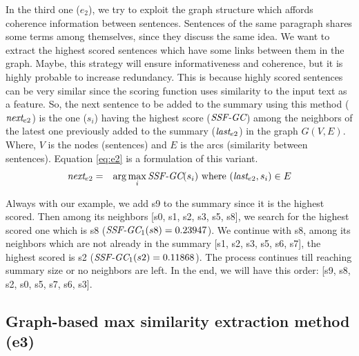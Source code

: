 In the third one ($ e_2 $), we try to exploit the graph structure which affords coherence information between sentences.
Sentences of the same paragraph shares some terms among themselves, since they discuss the same idea.
We want to extract the highest scored sentences which have some links between them in the graph.
Maybe, this strategy will ensure informativeness and coherence, but it is highly probable to increase redundancy. 
This is because highly scored sentences can be very similar since the scoring function uses similarity to the input text as a feature.  
So, the next sentence to be added to the summary using this method ($\operatorname{\textit{next}}_{e2}$) is the one ($s_i$) having the highest score ($ \operatorname{\textit{SSF-GC}} $) among the neighbors of the latest one previously added to the summary ($\operatorname{\textit{last}}_{e2}$) in the graph $ G(V, E) $.
Where, $ V $ is the nodes (sentences) and $ E $ is the arcs (similarity between sentences). 
Equation \ref{eq:e2} is a formulation of this variant.
\begin{equation}
	\begin{aligned}
		\operatorname{\textit{next}}_{e2} & = & \arg\max\limits_i \operatorname{\textit{SSF-GC}}(s_i)  
		\text{ where } (\operatorname{\textit{last}}_{e2}, s_i) \in E \\
	\end{aligned}
	\label{eq:e2}
\end{equation}

Always with our example, we add s9 to the summary since it is the highest scored. 
Then among its neighbors [s0, s1, s2, s3, s5, s8], we search for the highest scored one which is s8 ($ \operatorname{\textit{SSF-GC}}_1(s8) = 0.23947 $). 
We continue with s8, among its neighbors which are not already in the summary [s1, s2, s3, s5, s6, s7], the highest scored is s2 ($ \operatorname{\textit{SSF-GC}}_1(s2) = 0.11868 $).
The process continues till reaching summary size or no neighbors are left. 
In the end, we will have this order: [s9, s8, s2, s0, s5, s7, s6, s3].

\subsection{Graph-based max similarity extraction method (e3)}

